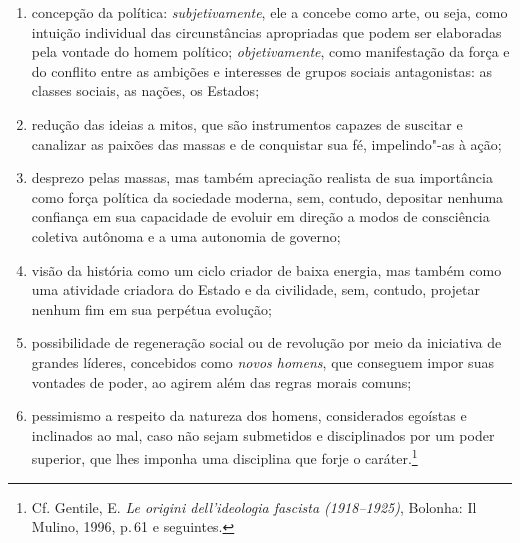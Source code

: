 \begin{enumerate}
\def\labelenumi{\alph{enumi})}
\item
  concepção da política: \emph{subjetivamente}, ele a concebe como arte,
  ou seja, como intuição individual das circunstâncias apropriadas que
  podem ser elaboradas pela vontade do homem político;
  \emph{objetivamente}, como manifestação da força e do conflito entre
  as ambições e interesses de grupos sociais antagonistas: as classes
  sociais, as nações, os Estados;
\item
  redução das ideias a mitos, que são instrumentos capazes de suscitar e
  canalizar as paixões das massas e de conquistar sua fé, impelindo"-as à
  ação;
\item
  desprezo pelas massas, mas também apreciação realista de sua
  importância como força política da sociedade moderna, sem, contudo,
  depositar nenhuma confiança em sua capacidade de evoluir em direção a
  modos de consciência coletiva autônoma e a uma autonomia de governo;
\item
  visão da história como um ciclo criador de baixa energia, mas também
  como uma atividade criadora do Estado e da civilidade, sem, contudo,
  projetar nenhum fim em sua perpétua evolução;
\item
  possibilidade de regeneração social ou de revolução por meio da
  iniciativa de grandes líderes, concebidos como \emph{novos homens},
  que conseguem impor suas vontades de poder, ao agirem além das regras
  morais comuns;
\item
  pessimismo a respeito da natureza dos homens, considerados egoístas e
  inclinados ao mal, caso não sejam submetidos e disciplinados por um
  poder superior, que lhes imponha uma disciplina que forje o
  caráter.\footnote{Cf. Gentile, E. \emph{Le origini dell'ideologia
    fascista (1918--1925)}, Bolonha: Il Mulino, 1996, p.\,61 e seguintes.}
\end{enumerate}

